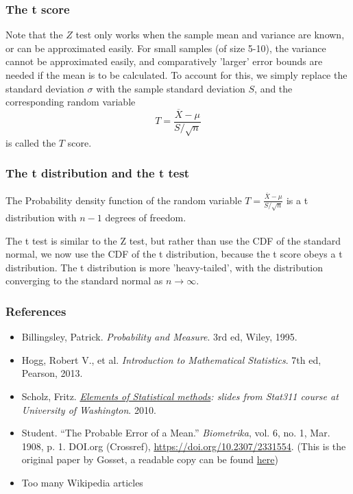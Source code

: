 \documentclass[10pt, aspectratio=169]{beamer}
\theoremstyle{definition}
\begin{document}
\begin{frame}
\frametitle{The t score}
Note that the $Z$ test only works when the sample mean and variance are known, or can be approximated easily. For small samples (of size 5-10), the variance cannot be approximated easily, and comparatively 'larger' error bounds are needed if the mean is to be calculated. To account for this, we simply replace the standard deviation $\sigma$ with the sample standard deviation $S$, and the corresponding random variable $$T = \frac{\overline{X}-\mu}{S/\sqrt{n}}$$ is called the $T$ score.
\end{frame}

\begin{frame}
\frametitle{The t distribution and the t test}
\begin{definition}
	The Probability density function of the random variable $T = \frac{\overline{X}-\mu}{S/\sqrt{n}}$ is a t distribution with $n-1$ degrees of freedom.
\end{definition}
\pause
\begin{definition}
	The t test is similar to the Z test, but rather than use the CDF of the standard normal, we now use the CDF of the t distribution, because the t score obeys a t distribution. The t distribution is more 'heavy-tailed', with the distribution converging to the standard normal as $n \to \infty$.
\end{definition}
\end{frame}

\begin{frame}
\frametitle{References}
\begin{itemize}
	\item Billingsley, Patrick. \textit{Probability and Measure}. 3rd ed, Wiley, 1995.
	\item Hogg, Robert V., et al. \textit{Introduction to Mathematical Statistics}. 7th ed, Pearson, 2013.
	\item Scholz, Fritz. \textit{\color{Burgundy} \href{http://faculty.washington.edu/fscholz/311/Stat311Location1.pdf}{Elements of Statistical methods}: slides from Stat311 course at University of Washington}. 2010.
	\item Student. “The Probable Error of a Mean.” \textit{Biometrika}, vol. 6, no. 1, Mar. 1908, p. 1. DOI.org (Crossref), {\color{Burgundy}\url{https://doi.org/10.2307/2331554}}. (This is the original paper by Gosset, a readable copy can be found {\color{Burgundy}\href{http://www.aliquote.org/cours/2012_biomed/biblio/Student1908.pdf}{here}})
	\item Too many Wikipedia articles
\end{itemize}
\end{frame}
\end{document}
